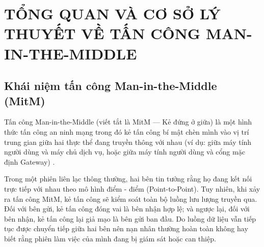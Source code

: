 \chapter{TỔNG QUAN VÀ CƠ SỞ LÝ THUYẾT VỀ TẤN CÔNG MAN-IN-THE-MIDDLE}

\section{Khái niệm tấn công Man-in-the-Middle (MitM)}

Tấn công Man-in-the-Middle (viết tắt là MitM --- Kẻ đứng ở giữa) là một hình thức tấn công an ninh mạng trong đó kẻ tấn công bí mật chèn mình vào vị trí trung gian giữa hai thực thể đang truyền thông với nhau (ví dụ: giữa máy tính người dùng và máy chủ dịch vụ, hoặc giữa máy tính người dùng và cổng mặc định Gateway) \cite{callegati2009mitm, alani2014mitm}.

Trong một phiên liên lạc thông thường, hai bên tin tưởng rằng họ đang kết nối trực tiếp với nhau theo mô hình điểm - điểm (Point-to-Point). Tuy nhiên, khi xảy ra tấn công MitM, kẻ tấn công sẽ kiểm soát toàn bộ luồng lưu lượng truyền qua. Đối với bên gửi, kẻ tấn công đóng vai là bên nhận hợp lệ; và ngược lại, đối với bên nhận, kẻ tấn công lại giả mạo là bên gửi ban đầu. Do luồng dữ liệu vẫn tiếp tục được chuyển tiếp giữa hai bên nên nạn nhân thường hoàn toàn không hay biết rằng phiên làm việc của mình đang bị giám sát hoặc can thiệp.


